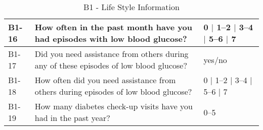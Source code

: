 \begin{table}[H]
\begin{tabular}{|l|l|l|}
        \\ \hline
        B1-16 & How often in the past month have you had episodes with low blood glucose? & 0 $\mid$ 1--2 $\mid$ 3--4 $\mid$ 5--6 $\mid$ 7
        \\ \hline
        B1-17 & Did you need assistance from others during any of these episodes of low blood glucose? & yes/no
        \\ \hline
        B1-18 & How often did you need assistance from others during episodes of low blood glucose? & 0 $\mid$ 1--2 $\mid$ 3--4 $\mid$ 5--6 $\mid$ 7
        \\ \hline
        B1-19 & How many diabetes check-up visits have you had in the past year? & 0--5
        \\ \hline
    \end{tabular}
    \caption{B1 - Life Style Information}
    \label{tab:Life-Style-Information}
\end{table}

